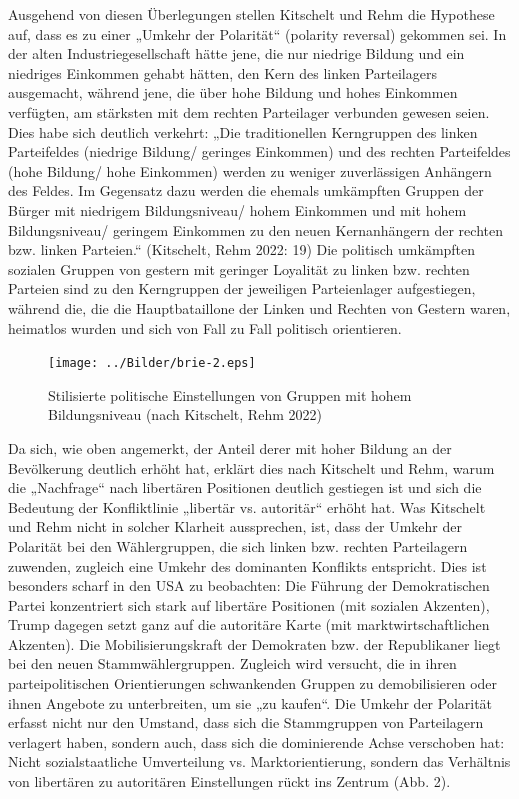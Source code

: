 \begin{multicols*}{2}
    Ausgehend von diesen Überlegungen stellen Kitschelt und Rehm die Hypothese auf, dass es zu einer „Umkehr der Polarität“ (polarity reversal) gekommen sei. In der alten Industriegesellschaft hätte jene, die nur niedrige Bildung und ein niedriges Einkommen gehabt hätten, den Kern des linken Parteilagers ausgemacht, während jene, die über hohe Bildung und hohes Einkommen verfügten, am stärksten mit dem rechten Parteilager verbunden gewesen seien. Dies habe sich deutlich verkehrt: „Die traditionellen Kerngruppen des linken Parteifeldes (niedrige Bildung/ geringes Einkommen) und des rechten Parteifeldes (hohe Bildung/ hohe Einkommen) werden zu weniger zuverlässigen Anhängern des Feldes. Im Gegensatz dazu werden die ehemals umkämpften Gruppen der Bürger mit niedrigem Bildungsniveau/ hohem Einkommen und mit hohem Bildungsniveau/ geringem Einkommen zu den neuen Kernanhängern der rechten bzw. linken Parteien.“ (Kitschelt, Rehm 2022: 19) Die politisch umkämpften sozialen Gruppen von gestern mit geringer Loyalität zu linken bzw. rechten Parteien sind zu den Kerngruppen der jeweiligen Parteienlager aufgestiegen, während die, die die Hauptbataillone der Linken und Rechten von Gestern waren, heimatlos wurden und sich von Fall zu Fall politisch orientieren.


    \begin{figure}
        \centering
        \caption{Stilisierte politische Einstellungen von Gruppen mit hohem Bildungsniveau (nach Kitschelt, Rehm 2022)}
        \texttt{[image: ../Bilder/brie-2.eps]} 
    \end{figure}


   
    Da sich, wie oben angemerkt, der Anteil derer mit hoher Bildung an der Bevölkerung deutlich erhöht hat, erklärt dies nach Kitschelt und Rehm, warum die „Nachfrage“ nach libertären Positionen deutlich gestiegen ist und sich die Bedeutung der Konfliktlinie „libertär vs. autoritär“ erhöht hat. Was Kitschelt und Rehm nicht in solcher Klarheit aussprechen, ist, dass der Umkehr der Polarität bei den Wählergruppen, die sich linken bzw. rechten Parteilagern zuwenden, zugleich eine Umkehr des dominanten Konflikts entspricht. Dies ist besonders scharf in den USA zu beobachten: Die Führung der Demokratischen Partei konzentriert sich stark auf libertäre Positionen (mit sozialen Akzenten), Trump dagegen setzt ganz auf die autoritäre Karte (mit marktwirtschaftlichen Akzenten). Die Mobilisierungskraft der Demokraten bzw. der Republikaner liegt bei den neuen Stammwählergruppen. Zugleich wird versucht, die in ihren parteipolitischen Orientierungen schwankenden Gruppen zu demobilisieren oder ihnen Angebote zu unterbreiten, um sie „zu kaufen“. Die Umkehr der Polarität erfasst nicht nur den Umstand, dass sich die Stammgruppen von Parteilagern verlagert haben, sondern auch, dass sich die dominierende Achse verschoben hat: Nicht sozialstaatliche Umverteilung vs. Marktorientierung, sondern das Verhältnis von libertären zu autoritären Einstellungen rückt ins Zentrum (Abb. 2).


\end{multicols*}
